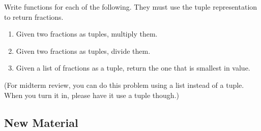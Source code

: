 \documentclass[11pt]{cselabheader}
\begin{document}
\begin{description}
    Write functions for each of the following. They must use the tuple
    representation to return fractions.
    \begin{enumerate}
      \item Given two fractions as tuples, multiply them.
      \item Given two fractions as tuples, divide them.
      \item Given a list of fractions as a tuple, return the one that is
        smallest in value.
    \end{enumerate}

    (For midterm review, you can do this problem using a list instead of a
    tuple. When you turn it in, please have it use a tuple though.)

\end{description}

\subsection{New Material}
\end{document}
